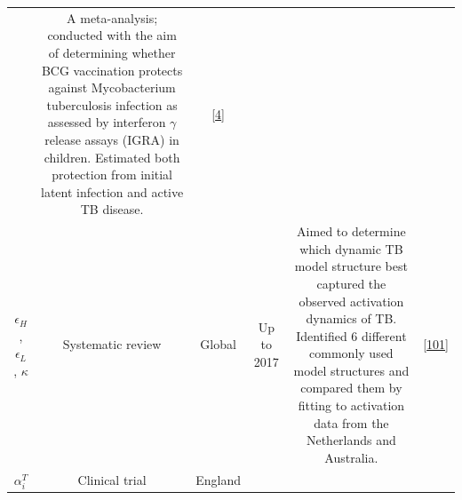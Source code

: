 \documentclass[11pt,twoside]{bristolthesis}
\begin{document}
\begin{longtable}[]{@{}cccccc@{}}
\begin{minipage}[t]{0.07\columnwidth}
  \end{minipage} & \begin{minipage}[t]{0.31\columnwidth}\centering
  A meta-analysis; conducted with the aim of
  determining whether BCG vaccination protects
  against Mycobacterium tuberculosis infection as
  assessed by interferon \(\gamma\) release assays
  (IGRA) in children. Estimated both protection from
  initial latent infection and active TB disease.\strut
  \end{minipage} & \begin{minipage}[t]{0.10\columnwidth}\centering
  {[}\protect\hyperlink{ref-Roy2014}{4}{]}\strut
  \end{minipage}\tabularnewline
  \begin{minipage}[t]{0.19\columnwidth}\centering
  \(\epsilon_H\),
  \(\epsilon_L\),
  \(\kappa\)\strut
  \end{minipage} & \begin{minipage}[t]{0.09\columnwidth}\centering
  Systematic
  review\strut
  \end{minipage} & \begin{minipage}[t]{0.07\columnwidth}\centering
  Global\strut
  \end{minipage} & \begin{minipage}[t]{0.07\columnwidth}\centering
  Up to
  2017\strut
  \end{minipage} & \begin{minipage}[t]{0.31\columnwidth}\centering
  Aimed to determine which dynamic TB model
  structure best captured the observed activation
  dynamics of TB. Identified 6 different commonly
  used model structures and compared them by fitting
  to activation data from the Netherlands and
  Australia.\strut
  \end{minipage} & \begin{minipage}[t]{0.10\columnwidth}\centering
  {[}\protect\hyperlink{ref-Ragonnet2017}{101}{]}\strut
  \end{minipage}\tabularnewline
  \begin{minipage}[t]{0.19\columnwidth}\centering
  \(\alpha_i^T\)\strut
  \end{minipage} & \begin{minipage}[t]{0.09\columnwidth}\centering
  Clinical
  trial\strut
  \end{minipage} & \begin{minipage}[t]{0.07\columnwidth}\centering
  England\strut
  \end{minipage} & \begin{minipage}[t]{0.07\columnwidth}\centering

\end{minipage}
\end{longtable}
\end{document}
